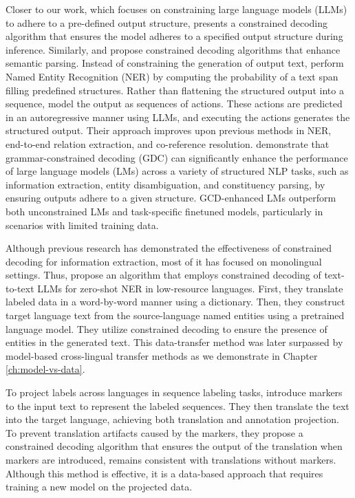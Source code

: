 Closer to our work, which focuses on constraining large language models (LLMs) to adhere to a pre-defined output structure, \citet{lu-etal-2021-text2event} presents a constrained decoding algorithm that ensures the model adheres to a specified output structure during inference. Similarly, \citet{zheng-etal-2023-grammar} and \citet{DBLP:journals/corr/abs-2302-02275} propose constrained decoding algorithms that enhance semantic parsing. Instead of constraining the generation of output text, \citet{cui-etal-2021-template} perform Named Entity Recognition (NER) by computing the probability of a text span filling predefined structures. Rather than flattening the structured output into a sequence, \citet{liu-etal-2022-autoregressive} model the output as sequences of actions. These actions are predicted in an autoregressive manner using LLMs, and executing the actions generates the structured output. Their approach improves upon previous methods in NER, end-to-end relation extraction, and co-reference resolution. \cite{DBLP:conf/emnlp/GengJP023} demonstrate that grammar-constrained decoding (GDC) can significantly enhance the performance of large language models (LMs) across a variety of structured NLP tasks, such as information extraction, entity disambiguation, and constituency parsing, by ensuring outputs adhere to a given structure. GCD-enhanced LMs outperform both unconstrained LMs and task-specific finetuned models, particularly in scenarios with limited training data.

Although previous research has demonstrated the effectiveness of constrained decoding for information extraction,  most of it has focused on monolingual settings. Thus, \citet{DBLP:conf/acl/GuoR21} propose an algorithm that employs constrained decoding of text-to-text LLMs for zero-shot NER in low-resource languages. First, they translate labeled data in a word-by-word manner using a dictionary. Then, they construct target language text from the source-language named entities using a pretrained language model. They utilize constrained decoding to ensure the presence of entities in the generated text. This data-transfer method was later surpassed by model-based cross-lingual transfer methods as we demonstrate in Chapter \ref{ch:model-vs-data}.

To project labels across languages in sequence labeling tasks, \citet{DBLP:journals/corr/abs-2402-03131} introduce markers to the input text to represent the labeled sequences. They then translate the text into the target language, achieving both translation and annotation projection. To prevent translation artifacts caused by the markers, they propose a constrained decoding algorithm that ensures the output of the translation when markers are introduced, remains consistent with translations without markers. Although this method is effective, it is a data-based approach that requires training a new model on the projected data. 

